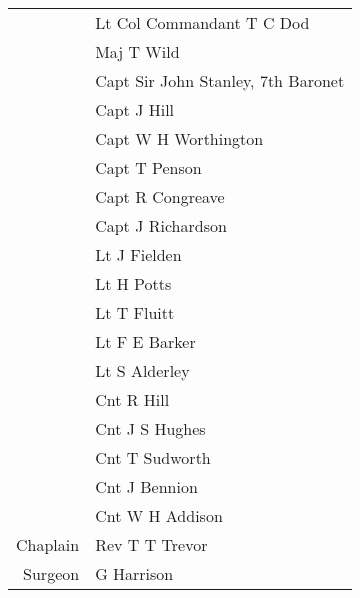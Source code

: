 \begin{center}
  \begin{tabular}{rl}
    & Lt Col Commandant T C Dod \\
    & Maj T Wild \\
    & Capt Sir John Stanley, 7th Baronet \\
    & Capt J Hill \\
    & Capt W H Worthington \\
    & Capt T Penson \\
    & Capt R Congreave \\
    & Capt J Richardson \\
    & Lt J Fielden \\
    & Lt H Potts \\
    & Lt T Fluitt \\
    & Lt F E Barker \\
    & Lt S Alderley \\
    & Cnt R Hill \\
    & Cnt J S Hughes \\
    & Cnt T Sudworth \\
    & Cnt J Bennion \\
    & Cnt W H Addison \\
    Chaplain & Rev T T Trevor \\
    Surgeon & G Harrison \\
  \end{tabular}
\end{center}
